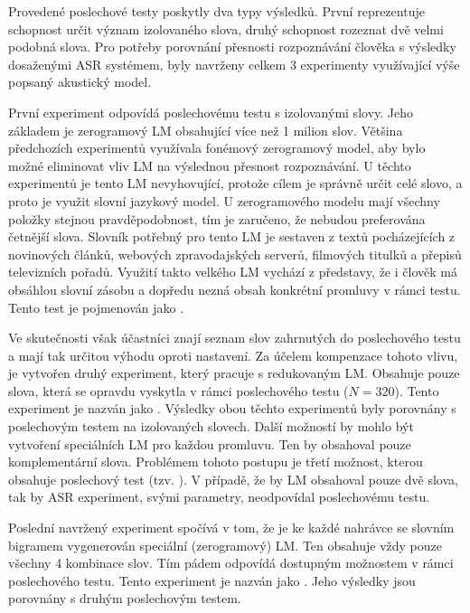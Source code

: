 Provedené poslechové testy poskytly dva typy výsledků.
První reprezentuje schopnost určit význam izolovaného slova, druhý schopnost rozeznat dvě velmi podobná slova.
Pro potřeby porovnání přesnosti rozpoznávání člověka s výsledky dosaženými ASR systémem, byly navrženy celkem $3$ experimenty využívající výše popsaný akustický model.

První experiment odpovídá poslechovému testu s izolovanými slovy.
Jeho základem je zerogramový LM obsahující více než 1 milion slov.
Většina předchozích experimentů využívala fonémový zerogramový model, aby bylo možné eliminovat vliv LM na výslednou přesnost rozpoznávání.
U těchto experimentů je tento LM nevyhovující, protože cílem je správně určit celé slovo, a proto je využit slovní jazykový model.
U zerogramového modelu mají všechny položky stejnou pravděpodobnost, tím je zaručeno, že nebudou preferována četnější slova.
Slovník potřebný pro tento LM je sestaven z textů pocházejících z novinových článků, webových zpravodajských serverů, filmových titulků a přepisů televizních pořadů.
Využití takto velkého LM vychází z představy, že i člověk má obsáhlou slovní zásobu a dopředu nezná obsah konkrétní promluvy v rámci testu.
Tento test je pojmenován jako .

Ve skutečnosti však účastníci znají seznam slov zahrnutých do poslechového testu a mají tak určitou výhodu oproti  nastavení.
Za účelem kompenzace tohoto vlivu, je vytvořen druhý experiment, který pracuje s redukovaným LM.
Obsahuje pouze slova, která se opravdu vyskytla v rámci poslechového testu ($N = 320$).
Tento experiment je nazván jako .
Výsledky obou těchto experimentů byly porovnány s poslechovým testem na izolovaných slovech.
Další možností by mohlo být vytvoření speciálních LM pro každou promluvu.
Ten by obsahoval pouze komplementární slova.
Problémem tohoto postupu je třetí možnost, kterou obsahuje poslechový test (tzv. ).
V případě, že by LM obsahoval pouze dvě slova, tak by ASR experiment, svými parametry, neodpovídal poslechovému testu.

Poslední navržený experiment spočívá v tom, že je ke každé nahrávce se slovním bigramem vygenerován speciální (zerogramový) LM.
Ten obsahuje vždy pouze všechny 4 kombinace slov.
Tím pádem odpovídá dostupným možnostem v rámci poslechového testu.
Tento experiment je nazván jako .
Jeho výsledky jsou porovnány s druhým poslechovým testem.


